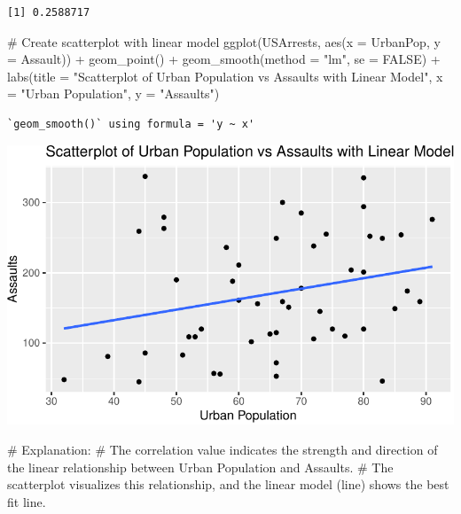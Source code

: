 \documentclass[
  letterpaper,
  DIV=11,
  numbers=noendperiod]{scrreprt}
\newenvironment{Shaded}{\begin{snugshade}}{\end{snugshade}}
\newcommand{\AttributeTok}[1]{\textcolor[rgb]{0.40,0.45,0.13}{#1}}
\newcommand{\CommentTok}[1]{\textcolor[rgb]{0.37,0.37,0.37}{#1}}
\newcommand{\ConstantTok}[1]{\textcolor[rgb]{0.56,0.35,0.01}{#1}}
\newcommand{\FunctionTok}[1]{\textcolor[rgb]{0.28,0.35,0.67}{#1}}
\newcommand{\NormalTok}[1]{\textcolor[rgb]{0.00,0.23,0.31}{#1}}
\newcommand{\SpecialCharTok}[1]{\textcolor[rgb]{0.37,0.37,0.37}{#1}}
\newcommand{\StringTok}[1]{\textcolor[rgb]{0.13,0.47,0.30}{#1}}
\begin{document}
\begin{verbatim}
[1] 0.2588717
\end{verbatim}

\begin{Shaded}
\begin{Highlighting}[]
\CommentTok{\# Create scatterplot with linear model}
\FunctionTok{ggplot}\NormalTok{(USArrests, }\FunctionTok{aes}\NormalTok{(}\AttributeTok{x =}\NormalTok{ UrbanPop, }\AttributeTok{y =}\NormalTok{ Assault)) }\SpecialCharTok{+}
  \FunctionTok{geom\_point}\NormalTok{() }\SpecialCharTok{+}
  \FunctionTok{geom\_smooth}\NormalTok{(}\AttributeTok{method =} \StringTok{"lm"}\NormalTok{, }\AttributeTok{se =} \ConstantTok{FALSE}\NormalTok{) }\SpecialCharTok{+}
  \FunctionTok{labs}\NormalTok{(}\AttributeTok{title =} \StringTok{"Scatterplot of Urban Population vs Assaults with Linear Model"}\NormalTok{, }\AttributeTok{x =} \StringTok{"Urban Population"}\NormalTok{, }\AttributeTok{y =} \StringTok{"Assaults"}\NormalTok{)}
\end{Highlighting}
\end{Shaded}

\begin{verbatim}
`geom_smooth()` using formula = 'y ~ x'
\end{verbatim}

\includegraphics{Linear_Modeling_and_Regression_files/figure-pdf/unnamed-chunk-24-1.pdf}

\begin{Shaded}
\begin{Highlighting}[]
\CommentTok{\# Explanation:}
\CommentTok{\# The correlation value indicates the strength and direction of the linear relationship between Urban Population and Assaults.}
\CommentTok{\# The scatterplot visualizes this relationship, and the linear model (line) shows the best fit line.}
\end{Highlighting}
\end{Shaded}
\end{document}
